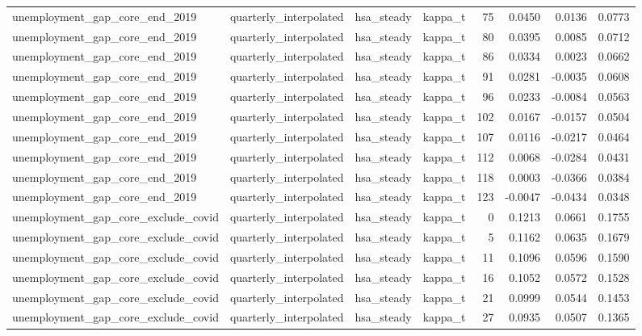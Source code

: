 \begin{tabular}{llllrrrr}
unemployment\_gap\_core\_end\_2019 & quarterly\_interpolated & hsa\_steady & kappa\_t & 75 & 0.0450 & 0.0136 & 0.0773 \\
unemployment\_gap\_core\_end\_2019 & quarterly\_interpolated & hsa\_steady & kappa\_t & 80 & 0.0395 & 0.0085 & 0.0712 \\
unemployment\_gap\_core\_end\_2019 & quarterly\_interpolated & hsa\_steady & kappa\_t & 86 & 0.0334 & 0.0023 & 0.0662 \\
unemployment\_gap\_core\_end\_2019 & quarterly\_interpolated & hsa\_steady & kappa\_t & 91 & 0.0281 & -0.0035 & 0.0608 \\
unemployment\_gap\_core\_end\_2019 & quarterly\_interpolated & hsa\_steady & kappa\_t & 96 & 0.0233 & -0.0084 & 0.0563 \\
unemployment\_gap\_core\_end\_2019 & quarterly\_interpolated & hsa\_steady & kappa\_t & 102 & 0.0167 & -0.0157 & 0.0504 \\
unemployment\_gap\_core\_end\_2019 & quarterly\_interpolated & hsa\_steady & kappa\_t & 107 & 0.0116 & -0.0217 & 0.0464 \\
unemployment\_gap\_core\_end\_2019 & quarterly\_interpolated & hsa\_steady & kappa\_t & 112 & 0.0068 & -0.0284 & 0.0431 \\
unemployment\_gap\_core\_end\_2019 & quarterly\_interpolated & hsa\_steady & kappa\_t & 118 & 0.0003 & -0.0366 & 0.0384 \\
unemployment\_gap\_core\_end\_2019 & quarterly\_interpolated & hsa\_steady & kappa\_t & 123 & -0.0047 & -0.0434 & 0.0348 \\
unemployment\_gap\_core\_exclude\_covid & quarterly\_interpolated & hsa\_steady & kappa\_t & 0 & 0.1213 & 0.0661 & 0.1755 \\
unemployment\_gap\_core\_exclude\_covid & quarterly\_interpolated & hsa\_steady & kappa\_t & 5 & 0.1162 & 0.0635 & 0.1679 \\
unemployment\_gap\_core\_exclude\_covid & quarterly\_interpolated & hsa\_steady & kappa\_t & 11 & 0.1096 & 0.0596 & 0.1590 \\
unemployment\_gap\_core\_exclude\_covid & quarterly\_interpolated & hsa\_steady & kappa\_t & 16 & 0.1052 & 0.0572 & 0.1528 \\
unemployment\_gap\_core\_exclude\_covid & quarterly\_interpolated & hsa\_steady & kappa\_t & 21 & 0.0999 & 0.0544 & 0.1453 \\
unemployment\_gap\_core\_exclude\_covid & quarterly\_interpolated & hsa\_steady & kappa\_t & 27 & 0.0935 & 0.0507 & 0.1365 \\

\end{tabular}
